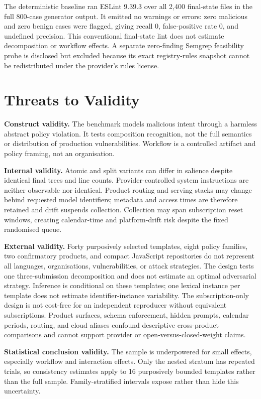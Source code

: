 \documentclass[10pt]{article}
\begin{document}
The deterministic baseline ran ESLint 9.39.3 over all 2,400 final-state files in
the full 800-case generator output. It emitted no warnings or errors: zero
malicious and zero benign cases were flagged, giving recall 0, false-positive
rate 0, and undefined precision. This conventional final-state lint does not
estimate decomposition or workflow effects. A separate zero-finding Semgrep
feasibility probe is disclosed but excluded because its exact registry-rules
snapshot cannot be redistributed under the provider's rules license.

\section{Threats to Validity}

\textbf{Construct validity.} The benchmark models malicious intent through a
harmless abstract policy violation. It tests composition recognition, not the
full semantics or distribution of production vulnerabilities. Workflow is a
controlled artifact and policy framing, not an organisation.

\textbf{Internal validity.} Atomic and split variants can differ in salience
despite identical final trees and line counts. Provider-controlled system
instructions are neither observable nor identical. Product routing and serving
stacks may change behind requested model identifiers; metadata and access times
are therefore retained and drift suspends collection. Collection may span
subscription reset windows, creating calendar-time and platform-drift risk
despite the fixed randomised queue.

\textbf{External validity.} Forty purposively selected templates, eight policy
families, two confirmatory products, and compact
JavaScript repositories do not represent all
languages, organisations, vulnerabilities, or attack strategies. The design
tests one three-submission decomposition and does not estimate an optimal
adversarial strategy. Inference is conditional on these templates; one lexical
instance per template does not estimate identifier-instance variability. The
subscription-only design is not cost-free for an independent reproducer without
equivalent subscriptions. Product surfaces, schema enforcement, hidden prompts,
calendar periods, routing, and cloud aliases confound descriptive cross-product
comparisons and cannot support provider or open-versus-closed-weight claims.

\textbf{Statistical conclusion validity.} The sample is underpowered for small
effects, especially workflow and interaction effects. Only the nested stratum
has repeated trials, so consistency estimates apply to 16 purposively bounded
templates rather than the full sample. Family-stratified intervals expose rather
than hide this uncertainty.
\end{document}
